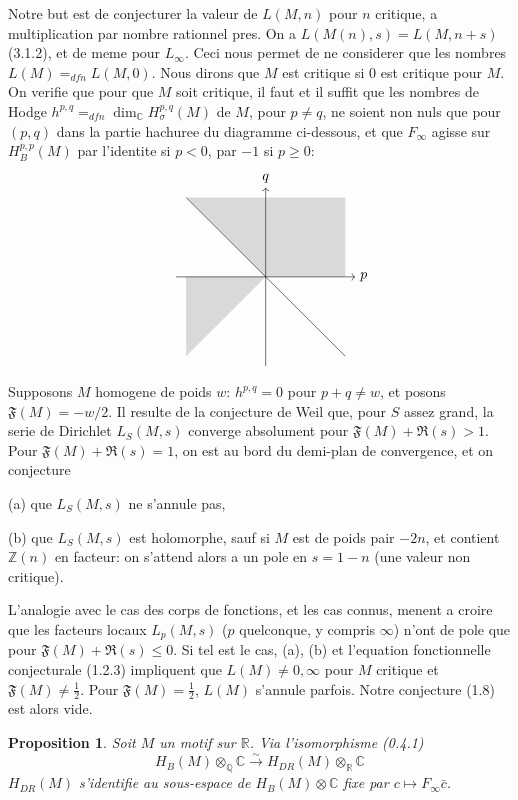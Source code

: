 \documentclass[12pt,a4paper]{article}
\theoremstyle{plain}
\newtheorem{proposition}[theorem]{Proposition}
\theoremstyle{definition}
\theoremstyle{remark}
\newcommand{\Q}{\mathbb{Q}}
\newcommand{\R}{\mathbb{R}}
\newcommand{\C}{\mathbb{C}}
\newcommand{\Z}{\mathbb{Z}}
\begin{document}
Notre but est de conjecturer la valeur de $L(M, n)$ pour $n$ critique, a multiplication par
nombre rationnel pres. On a $L(M(n), s) = L(M, n+s)$ (3.1.2), et de meme pour $L_\infty$.
Ceci nous permet de ne considerer que les nombres $L(M) =_{dfn} L(M, 0)$. Nous dirons que
$M$ est critique si $0$ est critique pour $M$. On verifie que pour que $M$ soit critique, il faut
et il suffit que les nombres de Hodge $h^{p,q} =_{dfn} \dim_\C H_\sigma^{p,q}(M)$ de $M$, pour
$p \neq q$, ne soient non nuls que pour $(p,q)$ dans la partie hachuree du diagramme
ci-dessous, et que $F_\infty$ agisse sur $H_B^{p,p}(M)$ par l'identite si $p < 0$, par $-1$ si
$p \geq 0$:
\begin{equation}\label{eq:1.3.1}
\begin{matrix}
\\
\end{matrix}
\qquad
\begin{tikzpicture}[scale=0.5,baseline]
\fill[gray!30] (-4,4) -- (0,0) -- (4,0) -- (4,4) -- cycle;
\fill[gray!30] (-4,-4) -- (0,0) -- (-4,0) -- cycle;
\draw[->] (-4.5,0) -- (4.5,0) node[right] {$p$};
\draw[->] (0,-4.5) -- (0,4.5) node[above] {$q$};
\draw (-4,4) -- (4,-4);
\end{tikzpicture}
\end{equation}

Supposons $M$ homogene de poids $w$: $h^{p,q} = 0$ pour $p + q \neq w$, et posons
$\mathfrak{F}(M) = -w/2$. Il resulte de la conjecture de Weil que, pour $S$ assez grand, la serie
de Dirichlet $L_S(M, s)$ converge absolument pour $\mathfrak{F}(M) + \Re(s) > 1$. Pour
$\mathfrak{F}(M) + \Re(s) = 1$, on est au bord du demi-plan de convergence, et on conjecture

(a) que $L_S(M, s)$ ne s'annule pas,

(b) que $L_S(M, s)$ est holomorphe, sauf si $M$ est de poids pair $-2n$, et contient
$\Z(n)$ en facteur: on s'attend alors a un pole en $s = 1-n$ (une valeur non critique).

L'analogie avec le cas des corps de fonctions, et les cas connus, menent a croire
que les facteurs locaux $L_p(M, s)$ ($p$ quelconque, y compris $\infty$) n'ont de pole que
pour $\mathfrak{F}(M) + \Re(s) \leq 0$. Si tel est le cas, (a), (b) et l'equation fonctionnelle
conjecturale (1.2.3) impliquent que $L(M) \neq 0, \infty$ pour $M$ critique et $\mathfrak{F}(M) \neq \tfrac{1}{2}$.
Pour $\mathfrak{F}(M) = \tfrac{1}{2}$, $L(M)$ s'annule parfois. Notre conjecture (1.8) est alors vide.

\begin{proposition}\label{prop:1.4}
Soit $M$ un motif sur $\R$. Via l'isomorphisme (0.4.1)
\[
H_B(M) \otimes_\Q \C \xrightarrow{\sim} H_{DR}(M) \otimes_\R \C
\]
$H_{DR}(M)$ s'identifie au sous-espace de $H_B(M) \otimes \C$ fixe par $c \mapsto F_\infty \bar{c}$.
\end{proposition}
\end{document}
